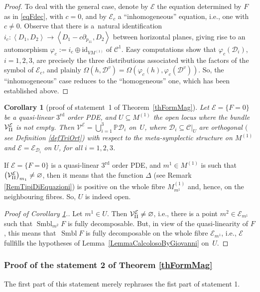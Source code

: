 \documentclass[10pt,a4paper]{amsart}
\newcommand{\C}{\mathcal{C}}
\newcommand{\D}{\mathcal{D}}
\newcommand{\M}{\mathcal{V}}
\newcommand{\MMM}{\mathcal{V}_{\textrm{\normalfont II}}}
\newcommand{\E}{\mathcal{E}}
\newcommand{\Span}[1]{\left\langle #1 \right\rangle}
\renewcommand{\P}{\mathbb{P}}
\newcommand{\id}{\mathrm{id}}
\newcommand{\Rd}{^\textrm{rd}}
\numberwithin{equation}{section}
\newtheorem{Corollary}[Theorem]{Corollary}
\begin{document}
\begin{proof}
To deal with the general case, denote by $\E$ the equation determined by $F$ as in \eqref{eqFdec}, with $c=0$, and by $\E_c$ a ``inhomogeneous'' equation, i.e., one with $c\neq 0$. Observe that there is a~natural identif\/ication $i_c\colon \Span{D_1,D_2}\longrightarrow\Span{D_1-c\partial_{p_{11}},D_2}$ between horizontal planes, giving rise to an automorphism $\varphi_c:=i_c\oplus\id_{VM^{(1)}}$ of $\C^1$. Easy computations show that $\varphi_c(\D_i)$, $i=1,2,3$, are precisely the three distributions associated with the factors of the symbol of $\E_c$, and plainly $\Omega(h,\D^v)=\Omega(\varphi_c(h),\varphi_c(\D^v))$. So, the ``inhomogeneous'' case reduces to the ``homogeneous'' one, which has been established above.
\end{proof}

\begin{Corollary}[proof of statement~1 of Theorem~\ref{thFormMag}]\label{corRicettaMagica}
 Let $\E=\{F=0\}$ be a quasi-linear $3\Rd$ order PDE, and $U\subseteq M^{(1)}$ the open
 locus where the bundle $\MMM ^\E$ is not empty. Then
$\M^\E =\bigcup_{i=1}^3\P\D_i$ on~$U$,
 where $\D_i\subseteq\C|_U$ are {orthogonal} $($see Definition {\rm \ref{defTriOrt})} with respect to the meta-symplectic structure on $M^{(1)}$ and $\E=\E_{\D_i}$ on $U$, for all $i=1,2,3$.
\end{Corollary}
If $\E=\{F=0\}$ is a quasi-linear $3\Rd$ order PDE, and $m^1\in M^{(1)}$ is such that $\left(\MMM^\E\right)_{m_1}\neq\varnothing$, then it means that the function $\Delta$ (see Remark \ref{RemTipiDiEquazioni}) is positive on the whole f\/ibre $M^{(1)}_{m^1}$ and, hence, on the neighbouring f\/ibres. So, $U$ is indeed open.
\begin{proof}[Proof of Corollary \ref{corRicettaMagica}.]
 Let $m^1\in U$. Then $\MMM ^\E\neq \varnothing$, i.e., there is a point $m^2\in \E_{m^1}$ such that $\operatorname{Smbl}_{m^2}F$ is fully decomposable. But, in view of the quasi-linearity of $F$, this means that~$\operatorname{Smbl} F$ is fully decomposable on the whole f\/ibre $\E_{m^1}$, i.e., $\E$ fullf\/ills the hypotheses of Lemma~\ref{LemmaCalcolosoByGiovanni} on~$U$.
\end{proof}

\subsubsection{Proof of the statement 2 of Theorem \ref{thFormMag}}\label{SubStat2}

The f\/irst part of this statement merely rephrases the f\/ist part of statement 1.
\end{document}
